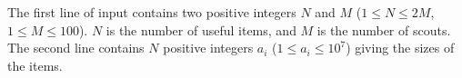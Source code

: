 
The first line of input contains two positive integers $N$ and $M$ ($1 \leq N \leq 2M$, $1 \leq M \leq 100$). 
$N$ is the number of useful items, and $M$ is the number of scouts. 
The second line contains $N$ positive integers $a_i$ ($1 \leq a_i\leq 10^7$) giving the sizes of the items. 


